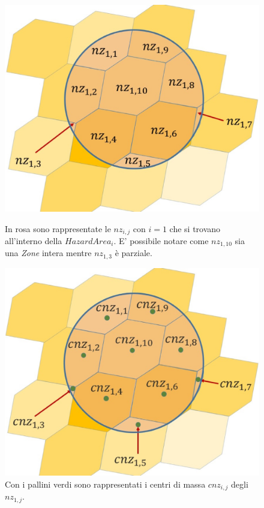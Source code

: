 \begin{enumerate}
	\begin{figure}[h]
		\hspace{0.1\linewidth}
		\begin{minipage}[t]{0.35\linewidth}
			\centering
			\includegraphics[width=1\textwidth]{images/NearestZone}
			\caption{In rosa sono rappresentate le $nz_{i,j}$ con $i=1$  che si trovano all'interno della $HazardArea_i$. E' possibile notare come $nz_{1,10}$ sia una \textit{Zone} intera mentre $nz_{1,3}$ è parziale.}
			\label{NearestLand}
		\end{minipage}
		\hspace{0.1\linewidth}
		\begin{minipage}[t]{0.35\linewidth}
			\centering
			\includegraphics[width=1\textwidth]{images/cnz}
			\caption{Con i pallini verdi sono rappresentati i centri di massa $cnz_{i,j}$ degli $nz_{1,j}$.}
			\label{cnz}
		\end{minipage}
	\end{figure}
	

\end{enumerate}
